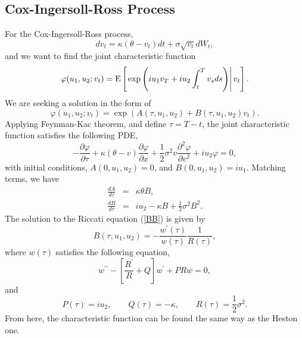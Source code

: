 \documentclass[12pt]{article}
\begin{document}
  \subsection{Cox-Ingersoll-Ross Process}

    For the Cox-Ingersoll-Ross process,
    \begin{equation}
      dv_t = \kappa(\theta - v_t)dt + \sigma\sqrt{v_t}dW_t,
    \end{equation}
    and we want to find the joint characteristic function
    \begin{equation}
      \varphi(u_1,u_2;v_t)={\rm E}\left[\left. \exp\left(iu_1v_T+iu_2\int_t^Tv_sds\right)\right| v_t\right].
    \end{equation}
    We are seeking a solution in the form of
    \begin{equation}
      \varphi(u_1,u_2;v_t)=\exp\left(A(\tau,u_1,u_2)+B(\tau,u_1,u_2)v_t\right).
    \end{equation}
    Applying Feynman-Kac theorem, and define $\tau=T-t$, the joint characteristic function satisfies the following PDE,
    \begin{equation}
      -\frac{\partial \varphi}{\partial \tau}
      + \kappa(\theta - v)\frac{\partial \varphi}{\partial x}
      +\frac{1}{2}\sigma^2v\frac{\partial^2 \varphi}{\partial v^2}
      +iu_2\varphi = 0,
    \end{equation}
    with initial conditions, $A(0,u_1,u_2)=0$, and $B(0,u_1,u_2)=iu_1$. Matching terms, we have
    \begin{eqnarray}
      \frac{dA}{d\tau} &=& \kappa\theta B, \label{AA} \\
      \frac{dB}{d\tau} &=& iu_2 - \kappa B + \frac{1}{2}\sigma^2B^2. \label{BB}
    \end{eqnarray}
    The solution to the Riccati equation (\ref{BB}) is given by
    \begin{equation}
      B(\tau,u_1,u_2)=-\frac{w^{\prime}(\tau)}{w(\tau)}\frac{1}{R(\tau)},
    \end{equation}
    where $w(\tau)$ satisfies the following equation,
    \begin{equation}
      w^{\prime\prime}-\left[\frac{R^{\prime}}{R}+Q\right]w^{\prime}+PRw=0,
    \end{equation}
    and
    \begin{equation}
      P(\tau) = iu_2, \quad\quad Q(\tau)=-\kappa, \quad\quad R(\tau)=\frac{1}{2}\sigma^2.
    \end{equation}
    From here, the characteristic function can be found the same way as the Heston one.
\end{document}
